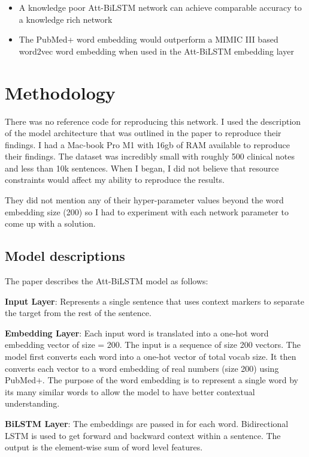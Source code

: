 \documentclass[11pt,a4paper]{article}
\begin{document}
\begin{itemize}
    \item A knowledge poor Att-BiLSTM network can achieve comparable accuracy to a knowledge rich network
    \item The PubMed+ word embedding would outperform a MIMIC III based word2vec word embedding when used in the Att-BiLSTM embedding layer
\end{itemize}


\section{Methodology}

There was no reference code for reproducing this network. I used the description of the model architecture that was outlined in the paper to reproduce their findings. I had a Mac-book Pro M1 with 16gb of RAM available to reproduce their findings. The dataset was incredibly small with roughly 500 clinical notes and less than 10k sentences. When I began, I did not believe that resource constraints would affect my ability to reproduce the results.

They did not mention any of their hyper-parameter values beyond the word embedding size (200) so I had to experiment with each network parameter to come up with a solution.

\subsection{Model descriptions}
The paper describes the Att-BiLSTM model as follows:

\textbf{Input Layer}: Represents a single sentence that uses context markers to separate the target from the rest of the sentence.

\textbf{Embedding Layer}: Each input word is translated into a one-hot word embedding vector of size = 200. The input is a sequence of size 200 vectors. The model first converts each word into a one-hot vector of total vocab size. It then converts each vector to a word embedding of real numbers (size 200) using PubMed+. The purpose of the word embedding is to represent a single word by its many similar words to allow the model to have better contextual understanding.

\textbf{BiLSTM Layer}: The embeddings are passed in for each word. Bidirectional LSTM is used to get forward and backward context within a sentence. The output is the element-wise sum of word level features.
\end{document}
